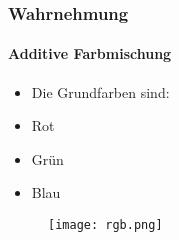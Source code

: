 \begin{frame}
    \frametitle{Wahrnehmung}
    \framesubtitle{Additive Farbmischung}
    \begin{minipage}{0.5\textwidth}
        \begin{itemize}
            \item Die Grundfarben sind:
            \item Rot
            \item Grün
            \item Blau
        \end{itemize}
    \end{minipage} \hfill
    \begin{minipage}{0.45\textwidth}
        \begin{figure}
            \texttt{[image: rgb.png]}
        \end{figure}
    \end{minipage}
\end{frame}

